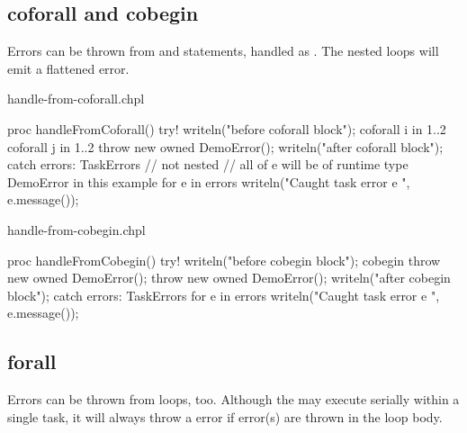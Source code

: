 \subsection{coforall and cobegin}
\label{Errors_coforall_and_cobegin}

Errors can be thrown from  and 
statements, handled as . The nested 
loops will emit a flattened  error.

\begin{chapelexample}{handle-from-coforall.chpl}
\begin{chapel}
proc handleFromCoforall() {
  try! {
    writeln("before coforall block");
    coforall i in 1..2 {
      coforall j in 1..2 {
        throw new owned DemoError();
      }
    }
    writeln("after coforall block");
  } catch errors: TaskErrors { // not nested
    // all of e will be of runtime type DemoError in this example
    for e in errors {
      writeln("Caught task error e ", e.message());
    }
  }
}
\end{chapel}
\begin{chapelpost}
\end{chapelpost}
\begin{chapeloutput}
\end{chapeloutput}
\end{chapelexample}

\begin{chapelexample}{handle-from-cobegin.chpl}
\begin{chapel}
proc handleFromCobegin() {
  try! {
    writeln("before cobegin block");
    cobegin {
      throw new owned DemoError();
      throw new owned DemoError();
    }
    writeln("after cobegin block");
  } catch errors: TaskErrors {
    for e in errors {
      writeln("Caught task error e ", e.message());
    }
  }
}
\end{chapel}
\begin{chapelpost}
\end{chapelpost}
\begin{chapeloutput}
\end{chapeloutput}
\end{chapelexample}

\subsection{forall}
\label{Errors_forall}

Errors can be thrown from  loops, too.
Although the  may execute serially within
a single task, it will always throw a  error
if error(s) are thrown in the loop body.

